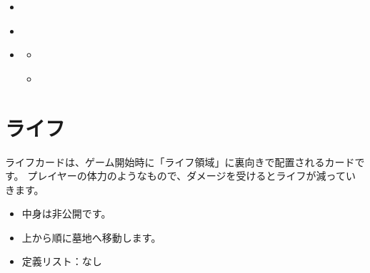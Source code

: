 \documentclass[letterpaper,10pt,dvipdfmx]{sphinxmanual}
\renewcommand{\spxentry}{\item}
\begin{document}
\begin{sphinxShadowBox}
\begin{itemize}
\begin{itemize}
\end{itemize}

\item {} 
\sphinxAtStartPar
{}\label{\detokenize{component/component:id30}}{\hyperref[\detokenize{component/component:id15}]{}}

\item {} 
\sphinxAtStartPar
{}\label{\detokenize{component/component:id31}}{\hyperref[\detokenize{component/component:id16}]{}}

\item {} 
\sphinxAtStartPar
{}\label{\detokenize{component/component:id32}}{\hyperref[\detokenize{component/component:id17}]{}}
\begin{itemize}
\item {} 
\sphinxAtStartPar
{}\label{\detokenize{component/component:id33}}{\hyperref[\detokenize{component/component:id18}]{}}

\item {} 
\sphinxAtStartPar
{}\label{\detokenize{component/component:id34}}{\hyperref[\detokenize{component/component:id19}]{}}

\end{itemize}

\end{itemize}
\end{sphinxShadowBox}


\section{ライフ}
\label{\detokenize{component/component:id3}}
\index{ライフ@\spxentry{ライフ}}\ignorespaces 
\sphinxAtStartPar
ライフカードは、ゲーム開始時に「ライフ領域」に裏向きで配置されるカードです。
プレイヤーの体力のようなもので、ダメージを受けるとライフが減っていきます。
\begin{itemize}
\item {} 
\sphinxAtStartPar
中身は非公開です。

\item {} 
\sphinxAtStartPar
上から順に墓地へ移動します。

\item {} 
\sphinxAtStartPar
定義リスト：なし

\end{itemize}
\end{document}
